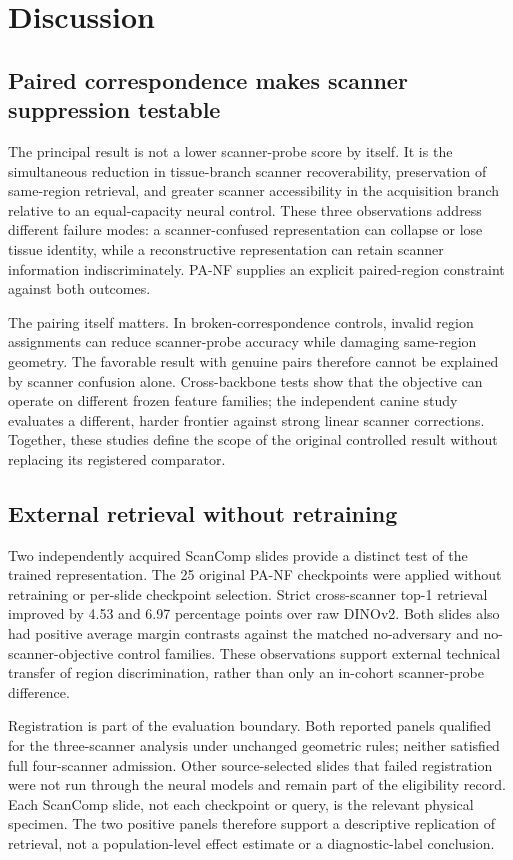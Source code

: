 \section{Discussion}

\subsection{Paired correspondence makes scanner suppression testable}
The principal result is not a lower scanner-probe score by itself. It is the simultaneous reduction in tissue-branch scanner recoverability, preservation of same-region retrieval, and greater scanner accessibility in the acquisition branch relative to an equal-capacity neural control. These three observations address different failure modes: a scanner-confused representation can collapse or lose tissue identity, while a reconstructive representation can retain scanner information indiscriminately. PA-NF supplies an explicit paired-region constraint against both outcomes.

The pairing itself matters. In broken-correspondence controls, invalid region assignments can reduce scanner-probe accuracy while damaging same-region geometry. The favorable result with genuine pairs therefore cannot be explained by scanner confusion alone. Cross-backbone tests show that the objective can operate on different frozen feature families; the independent canine study evaluates a different, harder frontier against strong linear scanner corrections. Together, these studies define the scope of the original controlled result without replacing its registered comparator.

\subsection{External retrieval without retraining}
Two independently acquired ScanComp slides provide a distinct test of the trained representation. The 25 original PA-NF checkpoints were applied without retraining or per-slide checkpoint selection. Strict cross-scanner top-1 retrieval improved by 4.53 and 6.97 percentage points over raw DINOv2. Both slides also had positive average margin contrasts against the matched no-adversary and no-scanner-objective control families. These observations support external technical transfer of region discrimination, rather than only an in-cohort scanner-probe difference.

Registration is part of the evaluation boundary. Both reported panels qualified for the three-scanner analysis under unchanged geometric rules; neither satisfied full four-scanner admission. Other source-selected slides that failed registration were not run through the neural models and remain part of the eligibility record. Each ScanComp slide, not each checkpoint or query, is the relevant physical specimen. The two positive panels therefore support a descriptive replication of retrieval, not a population-level effect estimate or a diagnostic-label conclusion.

